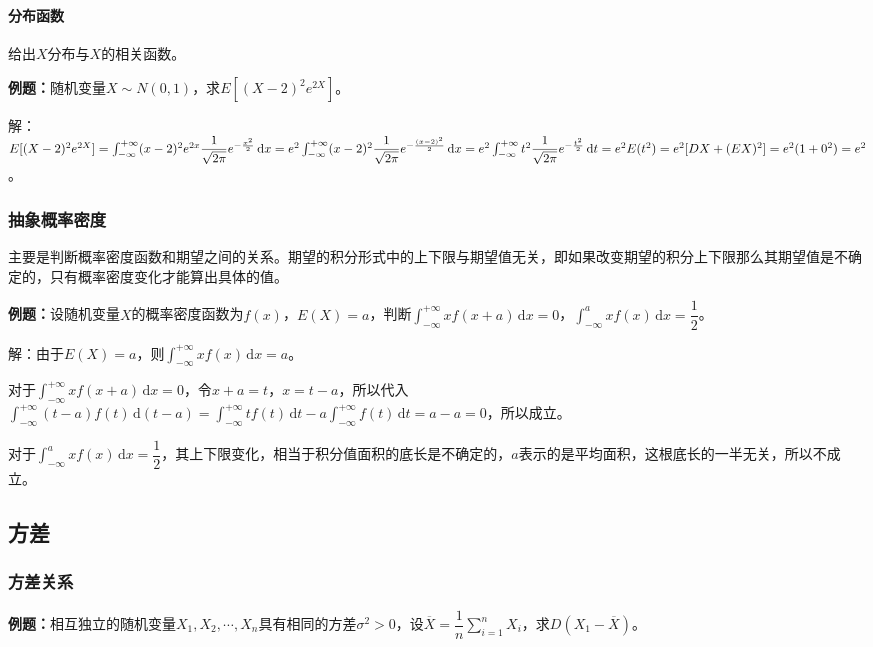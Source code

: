 \documentclass[UTF8, 12pt]{ctexart}
\begin{document}
\paragraph{分布函数} \leavevmode \medskip

给出$X$分布与$X$的相关函数。

\textbf{例题：}随机变量$X\sim N(0,1)$，求$E[(X-2)^2e^{2X}]$。

解：$E[(X-2)^2e^{2X}]=\int_{-\infty}^{+\infty}(x-2)^2e^{2x}\dfrac{1}{\sqrt{2\pi}}e^{-\frac{x^2}{2}}\,\textrm{d}x\\=e^2\int_{-\infty}^{+\infty}(x-2)^2\dfrac{1}{\sqrt{2\pi}}e^{-\frac{(x-2)^2}{2}}\,\textrm{d}x=e^2\int_{-\infty}^{+\infty}t^2\dfrac{1}{\sqrt{2\pi}}e^{-\frac{t^2}{2}}\,\textrm{d}t=e^2E(t^2)=e^2[DX+(EX)^2]=e^2(1+0^2)=e^2$。

\subsubsection{抽象概率密度}

主要是判断概率密度函数和期望之间的关系。期望的积分形式中的上下限与期望值无关，即如果改变期望的积分上下限那么其期望值是不确定的，只有概率密度变化才能算出具体的值。

\textbf{例题：}设随机变量$X$的概率密度函数为$f(x)$，$E(X)=a$，判断$\int_{-\infty}^{+\infty}xf(x+a)\,\textrm{d}x=0$，$\int_{-\infty}^axf(x)\,\textrm{d}x=\dfrac{1}{2}$。

解：由于$E(X)=a$，则$\int_{-\infty}^{+\infty}xf(x)\,\textrm{d}x=a$。

对于$\int_{-\infty}^{+\infty}xf(x+a)\,\textrm{d}x=0$，令$x+a=t$，$x=t-a$，所以代入$\int_{-\infty}^{+\infty}(t-a)f(t)\,\textrm{d}(t-a)=\int_{-\infty}^{+\infty}tf(t)\,\textrm{d}t-a\int_{-\infty}^{+\infty}f(t)\,\textrm{d}t=a-a=0$，所以成立。

对于$\int_{-\infty}^axf(x)\,\textrm{d}x=\dfrac{1}{2}$，其上下限变化，相当于积分值面积的底长是不确定的，$a$表示的是平均面积，这根底长的一半无关，所以不成立。

\subsection{方差}

\subsubsection{方差关系}

\textbf{例题：}相互独立的随机变量$X_1,X_2,\cdots,X_n$具有相同的方差$\sigma^2>0$，设$\overline{X}=\dfrac{1}{n}\sum\limits_{i=1}^nX_i$，求$D(X_1-\overline{X})$。
\end{document}
